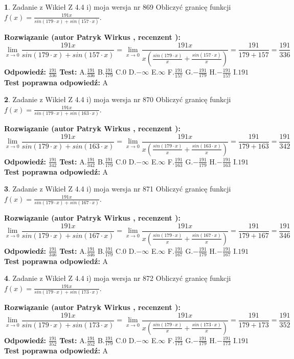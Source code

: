\documentclass[12pt, a4paper]{article}
\theoremstyle{definition} %
\newtheorem{zad}{}
\newcommand{\zadStart}[1]{\begin{zad}#1\newline}
\newcommand{\zadStop}{\end{zad}}
\newcommand{\rozwStart}[2]{\noindent \textbf{Rozwiązanie (autor #1 , recenzent #2): }\newline}
\newcommand{\rozwStop}{\newline}
\newcommand{\odpStart}{\noindent \textbf{Odpowiedź:}\newline}
\newcommand{\odpStop}{\newline}
\newcommand{\testStart}{\noindent \textbf{Test:}\newline}
\newcommand{\testStop}{\newline}
\newcommand{\kluczStart}{\noindent \textbf{Test poprawna odpowiedź:}\newline}
\newcommand{\kluczStop}{\newline}
\begin{document}
\zadStart{Zadanie z Wikieł Z 4.4 i) moja wersja nr 869}
Obliczyć granicę funkcji $f(x)=\frac{191x}{sin(179\cdot x) +sin(157\cdot x)}$.
\zadStop
\rozwStart{Patryk Wirkus}{}
$$\lim\limits_{x\to 0}\frac{191x}{sin(179\cdot x) +sin(157\cdot x)}=\lim\limits_{x\to 0}\frac{191x}{x(\frac{sin(179\cdot x)}{x}+\frac{sin(157\cdot x)}{x})}=\frac{191}{179+157} = \frac{191}{336}$$
\rozwStop
\odpStart
$\frac{191}{336}$
\odpStop
\testStart
A.$\frac{191}{336}$
B.$\frac{191}{179}$
C.$0$
D.$-\infty$
E.$\infty$
F.$\frac{191}{157}$
G.$-\frac{191}{179}$
H.$-\frac{191}{157}$
I.$191$
\testStop
\kluczStart
A
\kluczStop



\zadStart{Zadanie z Wikieł Z 4.4 i) moja wersja nr 870}
Obliczyć granicę funkcji $f(x)=\frac{191x}{sin(179\cdot x) +sin(163\cdot x)}$.
\zadStop
\rozwStart{Patryk Wirkus}{}
$$\lim\limits_{x\to 0}\frac{191x}{sin(179\cdot x) +sin(163\cdot x)}=\lim\limits_{x\to 0}\frac{191x}{x(\frac{sin(179\cdot x)}{x}+\frac{sin(163\cdot x)}{x})}=\frac{191}{179+163} = \frac{191}{342}$$
\rozwStop
\odpStart
$\frac{191}{342}$
\odpStop
\testStart
A.$\frac{191}{342}$
B.$\frac{191}{179}$
C.$0$
D.$-\infty$
E.$\infty$
F.$\frac{191}{163}$
G.$-\frac{191}{179}$
H.$-\frac{191}{163}$
I.$191$
\testStop
\kluczStart
A
\kluczStop



\zadStart{Zadanie z Wikieł Z 4.4 i) moja wersja nr 871}
Obliczyć granicę funkcji $f(x)=\frac{191x}{sin(179\cdot x) +sin(167\cdot x)}$.
\zadStop
\rozwStart{Patryk Wirkus}{}
$$\lim\limits_{x\to 0}\frac{191x}{sin(179\cdot x) +sin(167\cdot x)}=\lim\limits_{x\to 0}\frac{191x}{x(\frac{sin(179\cdot x)}{x}+\frac{sin(167\cdot x)}{x})}=\frac{191}{179+167} = \frac{191}{346}$$
\rozwStop
\odpStart
$\frac{191}{346}$
\odpStop
\testStart
A.$\frac{191}{346}$
B.$\frac{191}{179}$
C.$0$
D.$-\infty$
E.$\infty$
F.$\frac{191}{167}$
G.$-\frac{191}{179}$
H.$-\frac{191}{167}$
I.$191$
\testStop
\kluczStart
A
\kluczStop



\zadStart{Zadanie z Wikieł Z 4.4 i) moja wersja nr 872}
Obliczyć granicę funkcji $f(x)=\frac{191x}{sin(179\cdot x) +sin(173\cdot x)}$.
\zadStop
\rozwStart{Patryk Wirkus}{}
$$\lim\limits_{x\to 0}\frac{191x}{sin(179\cdot x) +sin(173\cdot x)}=\lim\limits_{x\to 0}\frac{191x}{x(\frac{sin(179\cdot x)}{x}+\frac{sin(173\cdot x)}{x})}=\frac{191}{179+173} = \frac{191}{352}$$
\rozwStop
\odpStart
$\frac{191}{352}$
\odpStop
\testStart
A.$\frac{191}{352}$
B.$\frac{191}{179}$
C.$0$
D.$-\infty$
E.$\infty$
F.$\frac{191}{173}$
G.$-\frac{191}{179}$
H.$-\frac{191}{173}$
I.$191$
\testStop
\kluczStart
A
\kluczStop
\end{document}

